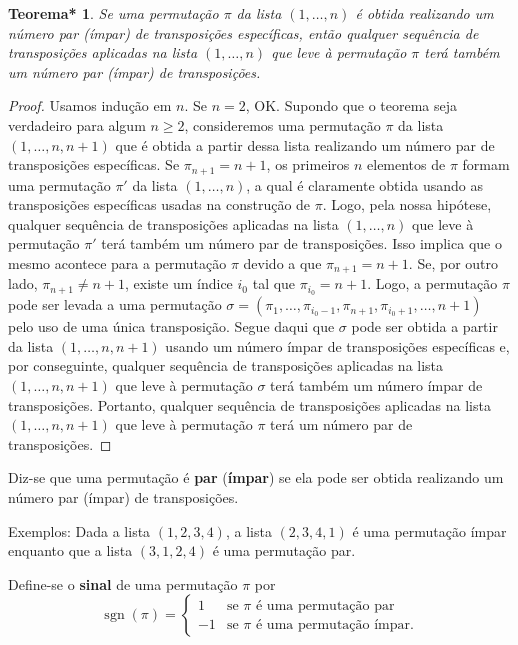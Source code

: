 \documentclass[12pt,a4paper]{report}
\newtheorem{thm*}[thm]{Teorema*}
\DeclareMathOperator{\sgn}{sgn}
\begin{document}
\begin{thm*}
  Se uma permutação $\pi$ da lista $(1,\ldots,n)$ é obtida realizando um número par (ímpar) de transposições específicas, então qualquer sequência de transposições aplicadas na lista $(1,\ldots,n)$ que leve à permutação $\pi$ terá também um número par (ímpar) de transposições.
\end{thm*}
\begin{proof}
  Usamos indução em $n$. Se $n=2$, OK. Supondo que o teorema seja verdadeiro para algum $n\ge 2$, consideremos uma permutação $\pi$ da lista $(1,\ldots,n,n+1)$ que é obtida a partir dessa lista realizando um número par de transposições específicas. Se $\pi_{n+1}=n+1$, os primeiros $n$ elementos de $\pi$ formam uma permutação $\pi'$ da lista $(1,\ldots,n)$, a qual é claramente obtida usando as transposições específicas usadas na construção de $\pi$. Logo, pela nossa hipótese, qualquer sequência de transposições aplicadas na lista $(1,\ldots,n)$ que leve à permutação $\pi'$ terá também um número par de transposições. Isso implica que o mesmo acontece para a permutação $\pi$ devido a que $\pi_{n+1}=n+1$.
  Se, por outro lado, $\pi_{n+1}\ne n+1$, existe um índice $i_0$ tal que $\pi_{i_0}=n+1$. Logo, a permutação $\pi$ pode ser levada a uma permutação $\sigma=(\pi_1,\ldots,\pi_{i_0-1},\pi_{n+1},\pi_{i_0+1},\ldots,n+1)$ pelo uso de uma única transposição.
  Segue daqui que $\sigma$ pode ser obtida a partir da lista $(1,\ldots,n,n+1)$ usando um número ímpar de transposições específicas e, por conseguinte, qualquer sequência de transposições aplicadas na lista $(1,\ldots,n,n+1)$ que leve à permutação $\sigma$ terá também um número ímpar de transposições. Portanto, qualquer sequência de transposições aplicadas na lista $(1,\ldots,n,n+1)$ que leve à permutação $\pi$ terá um número par de transposições.
\end{proof}


Diz-se que uma permutação é \textbf{par} (\textbf{ímpar}) se ela pode ser obtida realizando um número par (ímpar) de transposições.

Exemplos: Dada a lista $(1,2,3,4)$, a lista $(2,3,4,1)$ é uma permutação ímpar enquanto que a lista $(3,1,2,4)$ é uma permutação par.

Define-se o \textbf{sinal} de uma permutação $\pi$ por
$$\sgn(\pi)=\begin{cases}
  1&\text{se $\pi$ é uma permutação par}\\
  -1&\text{se $\pi$ é uma permutação ímpar.}
\end{cases}$$
\end{document}
